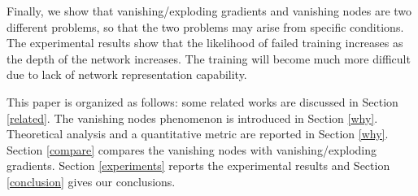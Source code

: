 
Finally, we show that vanishing/exploding gradients and vanishing nodes are two different problems, so that the two problems may arise from specific conditions. The experimental results show that the likelihood of failed training increases as the depth of the network increases. The training will become much more difficult due to lack of network representation capability. 

This paper is organized as follows: some related works are discussed in Section \ref{related}. The vanishing nodes phenomenon is introduced in Section \ref{why}. Theoretical analysis and a quantitative metric are  reported in Section \ref{why}. Section \ref{compare} compares the vanishing nodes with vanishing/exploding gradients. Section \ref{experiments} reports the experimental results and Section \ref{conclusion} gives our conclusions.

